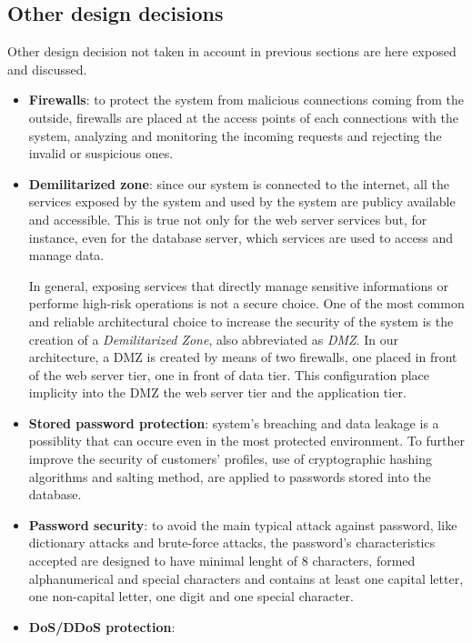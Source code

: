 \subsection{Other design decisions}

\label{sec:other-design-decisions}

Other design decision not taken in account in previous sections are here exposed and discussed.

\begin{itemize}
	\item \textbf{Firewalls}: to protect the system from malicious connections coming from the outside, firewalls are placed at the access points of each connections with the system, analyzing and monitoring the incoming requests and rejecting the invalid or suspicious ones.
	\item \textbf{Demilitarized zone}: since our system is connected to the internet, all the services exposed by the system and used by the system are publicy available and accessible. This is true not only for the web server services but, for instance, even for the database server, which services are used to access and manage data. 

In general, exposing services that directly manage sensitive informations or performe high-risk operations is not a secure choice. One of the most common and reliable architectural choice to increase the security of the system is the creation of a \textit{Demilitarized Zone}, also abbreviated as \textit{DMZ}. In our architecture, a DMZ is created by means of two firewalls, one placed in front of the web server tier, one in front of data tier. This configuration place implicity into the DMZ the web server tier and the application tier.
	\item \textbf{Stored password protection}: system's breaching and data leakage is a possiblity that can occure even in the most protected environment. To further improve the security of customers' profiles, use of cryptographic hashing algorithms and salting method, are applied to passwords stored into the database.
	\item \textbf{Password security}: to avoid the main typical attack against password, like dictionary attacks and brute-force attacks, the password's characteristics accepted are designed to have minimal lenght of 8 characters, formed alphanumerical and special characters and contains at least one capital letter, one non-capital letter, one digit and one special character.
	\item \textbf{DoS/DDoS protection}:
\end{itemize}
